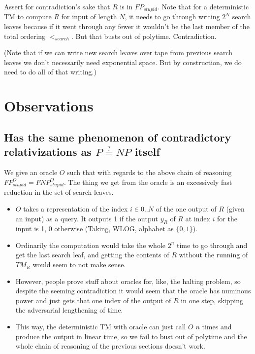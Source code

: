 \documentclass{article}
\begin{document}
Assert for contradiction's sake that $R$ is in $FP_{stupid}$. Note that for a deterministic TM to compute $R$ for input of length $N$, it needs to go through writing $2^N$ search leaves because if it went through any fewer it wouldn't be the last member of the total ordering $<_{search}$. But that busts out of polytime. Contradiction.

(Note that if we can write new search leaves over tape from previous search leaves we don't necessarily need exponential space. But by construction, we do need to do all of that writing.)

\section{Observations}

\subsection{Has the same phenomenon of contradictory relativizations as $P \stackrel{?}{=} NP$ itself}

We give an oracle $O$ such that with regards to the above chain of reasoning $FP^O_{stupid} = FNP^O_{stupid}$. The thing we get from the oracle is an excessively fast reduction in the set of search leaves.

\begin{itemize}

\item $O$ takes a representation of the index $i \in {0 .. N}$ of the one output of $R$ (given an input) as a query. It outputs 1 if the output $y_R$ of $R$ at index $i$ for the input is 1, 0 otherwise (Taking, WLOG, alphabet as $\{0, 1\}$).

\item Ordinarily the computation would take the whole $2^n$ time to go through and get the last search leaf, and getting the contents of $R$ without the running of $TM_R$ would seem to not make sense.

\item However, people prove stuff about oracles for, like, the halting problem, so despite the seeming contradiction it would seem that the oracle has numinous power and just gets that one index of the output of $R$ in one step, skipping the adversarial lengthening of time.

\item This way, the deterministic TM with oracle can just call $O$ $n$ times and produce the output in linear time, so we fail to bust out of polytime and the whole chain of reasoning of the previous sections doesn't work.
\end{itemize}
\end{document}
